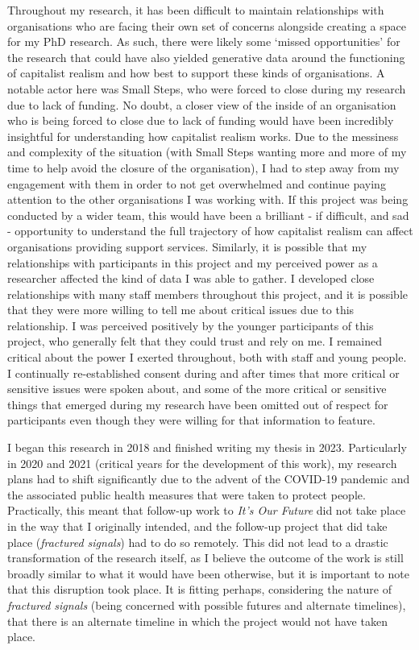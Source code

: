 Throughout my research, it has been difficult to maintain relationships with organisations who are facing their own set of concerns alongside creating a space for my PhD research. As such, there were likely some `missed opportunities' for the research that could have also yielded generative data around the functioning of capitalist realism and how best to support these kinds of organisations. A notable actor here was Small Steps, who were forced to close during my research due to lack of funding. No doubt, a closer view of the inside of an organisation who is being forced to close due to lack of funding would have been incredibly insightful for understanding how capitalist realism works. Due to the messiness and complexity of the situation (with Small Steps wanting more and more of my time to help avoid the closure of the organisation), I had to step away from my engagement with them in order to not get overwhelmed and continue paying attention to the other organisations I was working with. If this project was being conducted by a wider team, this would have been a brilliant - if difficult, and sad - opportunity to understand the full trajectory of how capitalist realism can affect organisations providing support services. Similarly, it is possible that my relationships with participants in this project and my perceived power as a researcher affected the kind of data I was able to gather. I developed close relationships with many staff members throughout this project, and it is possible that they were more willing to tell me about critical issues due to this relationship. I was perceived positively by the younger participants of this project, who generally felt that they could trust and rely on me. I remained critical about the power I exerted throughout, both with staff and young people. I continually re-established consent during and after times that more critical or sensitive issues were spoken about, and some of the more critical or sensitive things that emerged during my research have been omitted out of respect for participants even though they were willing for that information to feature.

I began this research in 2018 and finished writing my thesis in 2023. Particularly in 2020 and 2021 (critical years for the development of this work), my research plans had to shift significantly due to the advent of the COVID-19 pandemic and the associated public health measures that were taken to protect people. Practically, this meant that follow-up work to \textit{It's Our Future} did not take place in the way that I originally intended, and the follow-up project that did take place (\textit{fractured signals}) had to do so remotely. This did not lead to a drastic transformation of the research itself, as I believe the outcome of the work is still broadly similar to what it would have been otherwise, but it is important to note that this disruption took place. It is fitting perhaps, considering the nature of \textit{fractured signals} (being concerned with possible futures and alternate timelines), that there is an alternate timeline in which the project would not have taken place.

